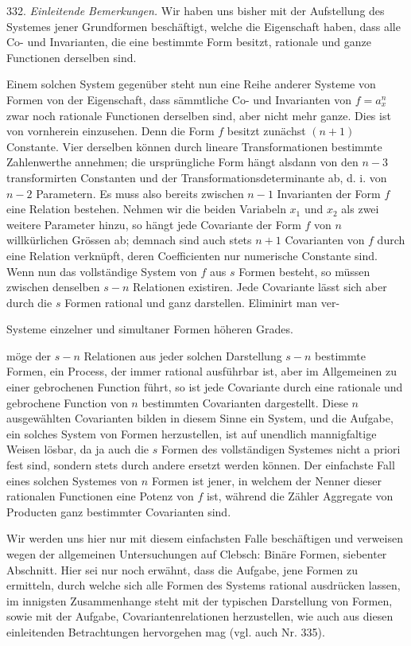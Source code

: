 \documentclass[11pt]{article}
\providecommand{\weberpage}[1]{}
\begin{document}
332. \textit{Einleitende Bemerkungen.} Wir haben uns bisher mit der Aufstellung des Systemes jener Grundformen beschäftigt, welche die Eigenschaft haben, dass alle Co- und Invarianten, die eine bestimmte Form besitzt, rationale und ganze Functionen derselben sind.

Einem solchen System gegenüber steht nun eine Reihe anderer Systeme von Formen von der Eigenschaft, dass sämmtliche Co- und Invarianten von $f = a_x^n$ zwar noch rationale Functionen derselben sind, aber nicht mehr ganze. Dies ist von vornherein einzusehen. Denn die Form $f$ besitzt zunächst $(n+1)$ Constante. Vier derselben können durch lineare Transformationen bestimmte Zahlenwerthe annehmen; die ursprüngliche Form hängt alsdann von den $n - 3$ transformirten Constanten und der Transformationsdeterminante ab, d. i. von $n - 2$ Parametern. Es muss also bereits zwischen $n - 1$ Invarianten der Form $f$ eine Relation bestehen. Nehmen wir die beiden Variabeln $x_1$ und $x_2$ als zwei weitere Parameter hinzu, so hängt jede Covariante der Form $f$ von $n$ willkürlichen Grössen ab; demnach sind auch stets $n + 1$ Covarianten von $f$ durch eine Relation verknüpft, deren Coefficienten nur numerische Constante sind. Wenn nun das vollständige System von $f$ aus $s$ Formen besteht, so müssen zwischen denselben $s - n$ Relationen existiren. Jede Covariante lässt sich aber durch die $s$ Formen rational und ganz darstellen. Eliminirt man ver-


\weberpage{355}
Systeme einzelner und simultaner Formen höheren Grades.

möge der $s - n$ Relationen aus jeder solchen Darstellung $s - n$ bestimmte Formen, ein Process, der immer rational ausführbar ist, aber im Allgemeinen zu einer gebrochenen Function führt, so ist jede Covariante durch eine rationale und gebrochene Function von $n$ bestimmten Covarianten dargestellt. Diese $n$ ausgewählten Covarianten bilden in diesem Sinne ein System, und die Aufgabe, ein solches System von Formen herzustellen, ist auf unendlich mannigfaltige Weisen lösbar, da ja auch die $s$ Formen des vollständigen Systemes nicht a priori fest sind, sondern stets durch andere ersetzt werden können. Der einfachste Fall eines solchen Systemes von $n$ Formen ist jener, in welchem der Nenner dieser rationalen Functionen eine Potenz von $f$ ist, während die Zähler Aggregate von Producten ganz bestimmter Covarianten sind.

Wir werden uns hier nur mit diesem einfachsten Falle beschäftigen und verweisen wegen der allgemeinen Untersuchungen auf Clebsch: \glqq Binäre Formen\grqq{}, siebenter Abschnitt. Hier sei nur noch erwähnt, dass die Aufgabe, jene Formen zu ermitteln, durch welche sich alle Formen des Systems rational ausdrücken lassen, im innigsten Zusammenhange steht mit der typischen Darstellung von Formen, sowie mit der Aufgabe, Covariantenrelationen herzustellen, wie auch aus diesen einleitenden Betrachtungen hervorgehen mag (vgl. auch Nr. 335).
\end{document}
